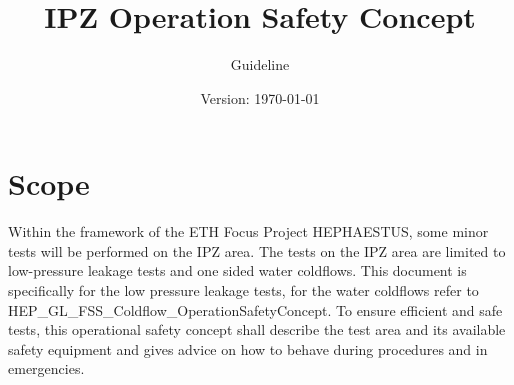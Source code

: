 \documentclass{article}
\title{IPZ Operation Safety Concept}
\author{Guideline}
\date{Version: \isodate\today}
\begin{document}
\maketitle

\thispagestyle{fancy}

\section{Scope}

Within the framework of the ETH Focus Project HEPHAESTUS, some minor tests will be performed on the IPZ area. The tests on the IPZ area are limited to low-pressure leakage tests and one sided water coldflows. This document is specifically for the low pressure leakage tests, for the water coldflows refer to HEP\_GL\_FSS\_Coldflow\_OperationSafetyConcept. To ensure efficient and safe tests, this operational safety concept shall describe the test area and its available safety equipment and gives advice on how to behave during procedures and in emergencies.  
\\ \noindent
\end{document}
